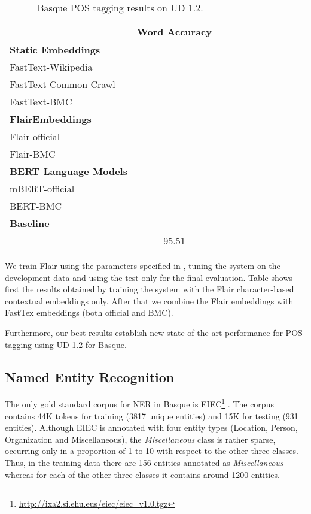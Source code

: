 \documentclass[10pt, a4paper]{article}
\begin{document}
\begin{table}[!t]\footnotesize
\centering
\begin{tabular}{@{\hspace{0.3cm}}lccc} \hline
 \textbf{} & \textbf{Word Accuracy} \\ \hline
\textbf{Static Embeddings} & \\
FastText-Wikipedia &  \\
FastText-Common-Crawl & \\
FastText-BMC  & \\ \hline
\textbf{FlairEmbeddings}\\
Flair-official &  \\
Flair-BMC  &  \\ \hline
\textbf{BERT Language Models}\\
mBERT-official  &  \\
BERT-BMC  & \\ \hline
\textbf{Baseline} \\
\cite{plank-etal-2016-multilingual} & 95.51 \\ \hline
\end{tabular}
\caption{Basque POS tagging results on UD 1.2.}\label{tab:pos}
\end{table}

We train Flair using the parameters specified in \cite{akbik2019naacl}, tuning the system on the development data and using the test only for the final evaluation.
Table shows first the results obtained by training the system with the Flair character-based contextual embeddings only. After that we combine the Flair embeddings with FastTex embeddings (both official and BMC).


Furthermore, our best results establish new state-of-the-art performance for POS tagging using UD 1.2 for Basque.


\subsection{Named Entity Recognition}\label{sec:named-entity-recogn}

The only gold standard corpus for NER in Basque is EIEC\footnote{\url{http://ixa2.si.ehu.eus/eiec/eiec_v1.0.tgz}} \cite{alegria2006lessons}. The corpus contains 44K tokens for training (3817 unique entities) and 15K for testing (931 entities). Although EIEC is annotated with four entity types (Location, Person, Organization and Miscellaneous), the \emph{Miscellaneous} class is rather sparse, occurring only in a proportion of 1 to 10 with respect to the other three classes. Thus, in the training data there are 156 entities annotated as \emph{Miscellaneous} whereas for each of the other three classes it contains around 1200 entities.
\end{document}
